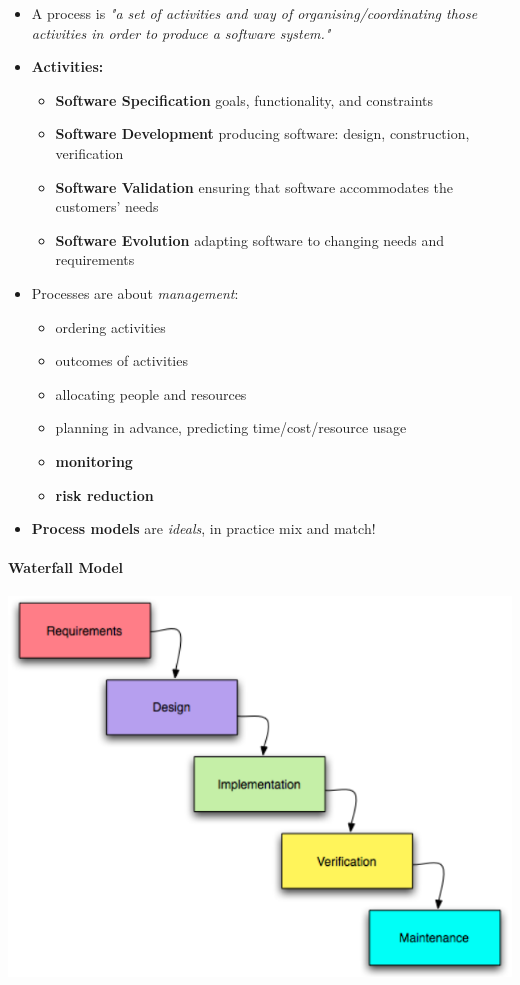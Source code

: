 \documentclass[a4paper]{article}
\providecommand{\tightlist}{%
  \setlength{\itemsep}{0pt}\setlength{\parskip}{0pt}}
\let\oldparagraph\paragraph
\renewcommand{\paragraph}[1]{\oldparagraph{#1}\mbox{}}
\begin{document}
\begin{itemize}
\tightlist
\item
  A process is \emph{"a set of activities and way of
  organising/coordinating those activities in order to produce a
  software system."}
\item
  \textbf{Activities:}

  \begin{itemize}
  \tightlist
  \item
    \textbf{Software Specification} goals, functionality, and
    constraints
  \item
    \textbf{Software Development} producing software: design,
    construction, verification
  \item
    \textbf{Software Validation} ensuring that software accommodates the
    customers' needs
  \item
    \textbf{Software Evolution} adapting software to changing needs and
    requirements
  \end{itemize}
\item
  Processes are about \emph{management}:

  \begin{itemize}
  \tightlist
  \item
    ordering activities
  \item
    outcomes of activities
  \item
    allocating people and resources
  \item
    planning in advance, predicting time/cost/resource usage
  \item
    \textbf{monitoring}
  \item
    \textbf{risk reduction}
  \end{itemize}
\item
  \textbf{Process models} are \emph{ideals}, in practice mix and match!
\end{itemize}

\hypertarget{waterfall-model}{%
\paragraph{Waterfall Model}\label{waterfall-model}}

\includegraphics{2C-SE.assets/1543142448637.png}
\end{document}
